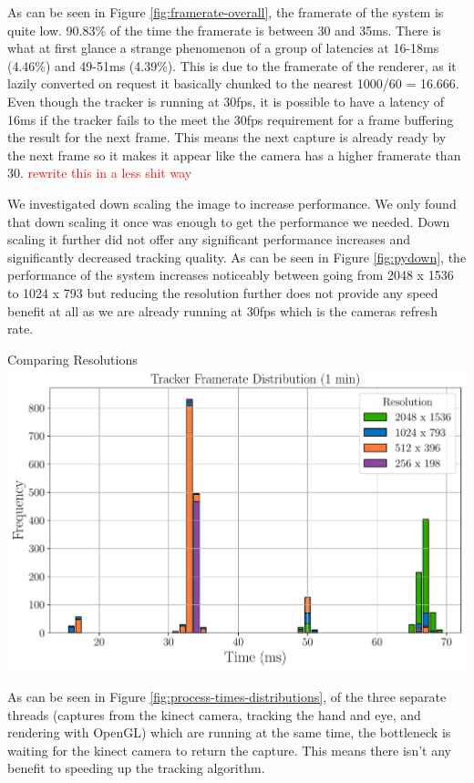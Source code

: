 As can be seen in Figure \ref{fig:framerate-overall}, the framerate of the system is quite low. 90.83\% of the time the framerate is between 30 and 35ms. There is what at first glance a strange phenomenon of a group of latencies at 16-18ms (4.46\%) and 49-51ms (4.39\%). This is due to the framerate of the renderer, as it lazily converted on request it basically chunked to the nearest 1000/60 = 16.666. Even though the tracker is running at 30fps, it is possible to have a latency of 16ms if the tracker fails to the meet the 30fps requirement for a frame buffering the result for the next frame. This means the next capture is already ready by the next frame so it makes it appear like the camera has a higher framerate than 30. \textcolor{red}{rewrite this in a less shit way}

We investigated down scaling the image to increase performance. We only found that down scaling it once was enough to get the performance we needed. Down scaling it further did not offer any significant performance increases and significantly decreased tracking quality. As can be seen in Figure \ref{fig:pydown}, the performance of the system increases noticeably between going from 2048 x 1536 to 1024 x 793 but reducing the resolution further does not provide any speed benefit at all as we are already running at 30fps which is the cameras refresh rate.

\begin{figureBox}[label={fig:pydown}, width=1.0\linewidth]{Comparing Resolutions}
	\includegraphics[width = 1.0\linewidth]{./evaluation/figures/pydown.pdf}
\end{figureBox}

As can be seen in Figure \ref{fig:process-times-distributions}, of the three separate threads (captures from the kinect camera, tracking the hand and eye, and rendering with OpenGL) which are running at the same time, the bottleneck is waiting for the kinect camera to return the capture. This means there isn't any benefit to speeding up the tracking algorithm.

